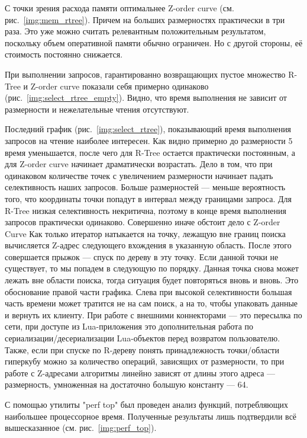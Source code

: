 С точки зрения расхода памяти оптимальнее Z-order curve (см. рис.~\ref{img:mem_rtree}).
Причем на больших размерностях практически в три раза.
Это уже можно считать релевантным положительным результатом, поскольку
объем оперативной памяти обычно ограничен. Но с другой стороны,
её стоимость постоянно снижается.

При выполнении запросов, гарантированно возвращающих пустое множество
R-Tree и Z-order curve показали себя примерно одинаково (рис.~\ref{img:select_rtree_empty}).
Видно, что время выполнения не зависит от размерности и нежелательные чтения отсутствуют.

Последний график (рис.~\ref{img:select_rtree}), показывающий время выполнения запросов на чтение наиболее интересен.
Как видно примерно до размерности 5 время уменьшается,
после чего для R-Tree остается практически постоянным, а для Z-order
curve начинает драматически возрастать.
Дело в том, что при одинаковом количестве точек с увеличением размерности
начинает падать селективность наших запросов. Больше размерностей ---
меньше вероятность того, что координаты точки попадут в интервал между
границами запроса. Для R-Tree низкая селективность некритична,
поэтому в конце время выполнения запросов практически одинаково.
Совершенно иначе обстоит дело с Z-order Curve
Как только итератор натыкается на точку, лежащую вне границ поиска
вычисляется Z-адрес следующего вхождения в указанную область.
После этого совершается прыжок --- спуск по дереву в эту точку.
Если данной точки не существует, то мы попадем в следующую по порядку.
Данная точка снова может лежать вне области поиска, тогда ситуация будет повторяться вновь и вновь. Это обоснование правой части графика.
Слева при высокой селективности большая часть времени может тратится
не на сам поиск, а на то, чтобы упаковать данные и вернуть их клиенту.
При работе с внешними коннекторами --- это пересылка по сети,
при доступе из Lua-приложения это дополнительная работа по сериализации/десериализации Lua-объектов перед возвратом пользователю.
Также, если при спуске по R-дереву понять принадлежность точки/области гиперкубу 
можно за количество операций, зависящих от размерности,
то при работе с Z-адресами алгоритмы линейно зависят от длины этого адреса ---
размерность, умноженная на достаточно большую константу --- 64.

С помощью утилиты "perf top" был проведен анализ функций,
потребляющих наибольшее процессорное время.
Полученные результаты лишь подтвердили всё вышесказанное
(см. рис.~\ref{img:perf_top}).

